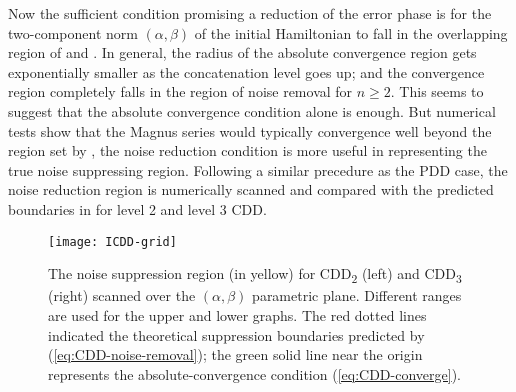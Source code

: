 \documentclass[aps,pra,reprint,superscriptaddress]{revtex4-2}
\begin{document}
Now the sufficient condition promising a reduction of the error phase is for the two-component norm $(\alpha,\beta)$ of the initial Hamiltonian to fall in the overlapping region of  and . 
% 
In general, the radius of the absolute convergence region gets exponentially smaller as the concatenation level goes up; and the convergence region completely falls in the region of noise removal for $n\ge 2$. This seems to suggest that the absolute convergence condition alone is enough.
But  numerical tests show that the Magnus series would typically convergence well beyond the region set by ,
the noise reduction condition  is more useful in 
representing the true noise suppressing region. Following a similar precedure as the PDD case, the noise reduction region is 
numerically scanned and compared with the predicted boundaries in  for level 2 and level 3 CDD.


\begin{figure}[ht]
\centering
\texttt{[image: ICDD-grid]}
\caption{The noise suppression region (in yellow) for CDD\textsubscript{2} (left) and CDD\textsubscript{3} (right) scanned over the $(\alpha,\beta)$ parametric plane.
Different ranges are used for the upper and lower graphs.
The red dotted lines indicated the theoretical suppression boundaries predicted by (\ref{eq:CDD-noise-removal}); the green solid line near the origin represents the absolute-convergence condition (\ref{eq:CDD-converge}).}
\label{fig:cdd-scan}
\end{figure}
\end{document}

